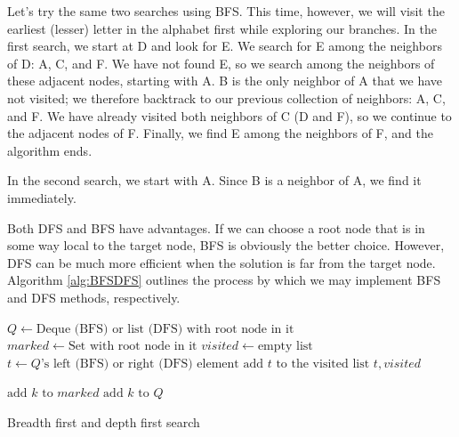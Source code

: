 Let's try the same two searches using BFS. This time, however, we will visit the earliest (lesser) letter in the alphabet first while exploring our branches.
In the first search, we start at D and look for E.
We search for E among the neighbors of D: A, C, and F.
We have not found E, so we search among the neighbors of these adjacent nodes, starting with A.
B is the only neighbor of A that we have not visited; we therefore backtrack to our previous collection of neighbors: A, C, and F.
We have already visited both neighbors of C (D and F), so we continue to the adjacent nodes of F. Finally, we find E among the neighbors of F, and the algorithm ends.

In the second search, we start with A.
Since B is a neighbor of A, we find it immediately.

Both DFS and BFS have advantages.
If we can choose a root node that is in some way local to the target node, BFS is obviously the better choice. However, DFS can be much more efficient when the solution is far from the target node. Algorithm \ref{alg:BFSDFS} outlines the process by which we may implement BFS and DFS methods, respectively.

\begin{algorithm}
\begin{algorithmic}[1]
	\State $Q \gets \text{Deque (BFS) or list (DFS) with root node in it}$	
	\State $marked \gets \text{Set with root node in it}$	
	\State $visited \gets \text{empty list}$	
							
		\State $t \gets Q\text{'s left (BFS) or right (DFS) element}$	
		\State $\text{add }t \text{ to the visited list}$
									
			\State {} $t,visited$
		
		\Else										{}
					\State $\text{add } k \text{ to } marked$
					\State $\text{add } k \text{ to } Q$
				\EndIf
			\EndFor
		\EndIf
	\EndWhile
\EndProcedure
\end{algorithmic}
\caption{Breadth first and depth first search}
\label{alg:BFSDFS}
\end{algorithm}

